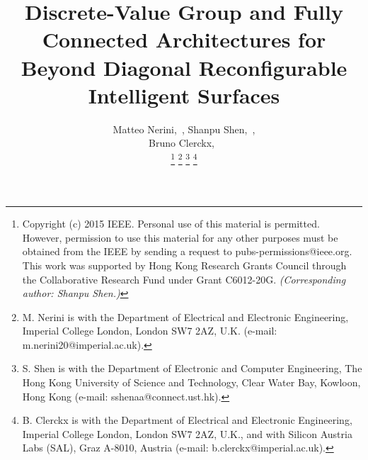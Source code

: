\documentclass[twocolumn,10pt]{IEEEtran}
\begin{document}
\title{Discrete-Value Group and Fully Connected Architectures for Beyond Diagonal Reconfigurable Intelligent Surfaces}

\author{Matteo Nerini,~,
        Shanpu Shen,~,\\
        Bruno Clerckx,~

\thanks{Copyright (c) 2015 IEEE.
Personal use of this material is permitted.
However, permission to use this material for any other purposes must be obtained from the IEEE by sending a request to pubs-permissions@ieee.org.
This work was supported by Hong Kong Research Grants Council through the Collaborative Research Fund under Grant C6012-20G.
\textit{(Corresponding author: Shanpu Shen.)}}%
\thanks{M. Nerini is with the Department of Electrical and Electronic Engineering, Imperial College London, London SW7 2AZ, U.K. (e-mail: m.nerini20@imperial.ac.uk).}%
\thanks{S. Shen is with the Department of Electronic and Computer Engineering, The Hong Kong University of Science and Technology, Clear Water Bay, Kowloon, Hong Kong (e-mail: sshenaa@connect.ust.hk).}
\thanks{B. Clerckx is with the Department of Electrical and Electronic Engineering, Imperial College London, London SW7 2AZ, U.K., and with Silicon Austria Labs (SAL), Graz A-8010, Austria (e-mail: b.clerckx@imperial.ac.uk).}}%




\maketitle
\end{document}
